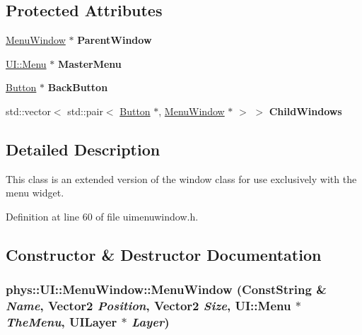 \subsection*{Protected Attributes}
\begin{DoxyCompactItemize}
\item 
\hypertarget{classphys_1_1UI_1_1MenuWindow_a94ec8861afbc6f39ac4b443a912bc0c1}{
\hyperlink{classphys_1_1UI_1_1MenuWindow}{MenuWindow} $\ast$ {\bfseries ParentWindow}}
\label{d4/d07/classphys_1_1UI_1_1MenuWindow_a94ec8861afbc6f39ac4b443a912bc0c1}

\item 
\hypertarget{classphys_1_1UI_1_1MenuWindow_adeed2fd68308846df8885febee141111}{
\hyperlink{classphys_1_1UI_1_1Menu}{UI::Menu} $\ast$ {\bfseries MasterMenu}}
\label{d4/d07/classphys_1_1UI_1_1MenuWindow_adeed2fd68308846df8885febee141111}

\item 
\hypertarget{classphys_1_1UI_1_1MenuWindow_a02826ad4a8d0b8934a7dbe86e4ea3edf}{
\hyperlink{classphys_1_1UI_1_1Button}{Button} $\ast$ {\bfseries BackButton}}
\label{d4/d07/classphys_1_1UI_1_1MenuWindow_a02826ad4a8d0b8934a7dbe86e4ea3edf}

\item 
\hypertarget{classphys_1_1UI_1_1MenuWindow_ae55c88520920e44c0bb125e812d62272}{
std::vector$<$ std::pair$<$ \hyperlink{classphys_1_1UI_1_1Button}{Button} $\ast$, \hyperlink{classphys_1_1UI_1_1MenuWindow}{MenuWindow} $\ast$ $>$ $>$ {\bfseries ChildWindows}}
\label{d4/d07/classphys_1_1UI_1_1MenuWindow_ae55c88520920e44c0bb125e812d62272}

\end{DoxyCompactItemize}


\subsection{Detailed Description}
This class is an extended version of the window class for use exclusively with the menu widget. 

Definition at line 60 of file uimenuwindow.h.



\subsection{Constructor \& Destructor Documentation}
\hypertarget{classphys_1_1UI_1_1MenuWindow_a302446ef6f8b160f1b8be2e3fdfda7b7}{
\subsubsection[{MenuWindow}]{\setlength{\rightskip}{0pt plus 5cm}phys::UI::MenuWindow::MenuWindow ({\bf ConstString} \& {\em Name}, \/  {\bf Vector2} {\em Position}, \/  {\bf Vector2} {\em Size}, \/  {\bf UI::Menu} $\ast$ {\em TheMenu}, \/  {\bf UILayer} $\ast$ {\em Layer})}}
\label{d4/d07/classphys_1_1UI_1_1MenuWindow_a302446ef6f8b160f1b8be2e3fdfda7b7}


